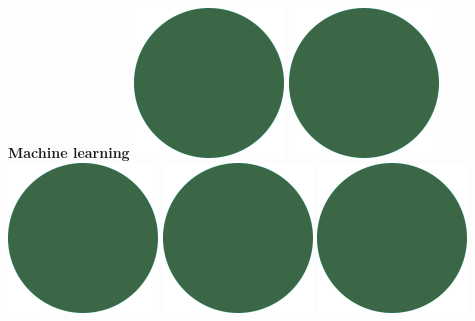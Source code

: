 \documentclass[]{commands}
\begin{document}
\begin{aside}
\textbf{Machine learning}\hfill
\includegraphics[scale=0.11]{img/IPSGreenDots.png}
\includegraphics[scale=0.11]{img/IPSGreenDots.png}
\includegraphics[scale=0.11]{img/IPSGreenDots.png}
\includegraphics[scale=0.11]{img/IPSGreenDots.png}
\includegraphics[scale=0.11]{img/IPSGreenDots.png}


\end{aside}
\end{document}
